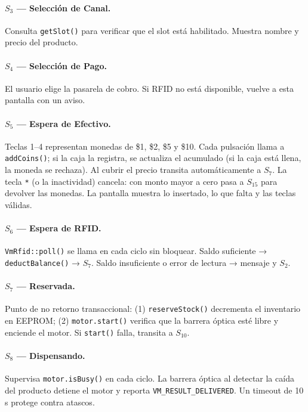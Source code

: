 \documentclass[12pt,a4paper]{article}
\begin{document}
\paragraph{$S_3$ — Selección de Canal.} Consulta \texttt{getSlot()} para
verificar que el slot está habilitado. Muestra nombre y precio del producto.

\paragraph{$S_4$ — Selección de Pago.} El usuario elige la pasarela de cobro.
Si RFID no está disponible, vuelve a esta pantalla con un aviso.

\paragraph{$S_5$ — Espera de Efectivo.} Teclas 1–4 representan monedas de
\$1, \$2, \$5 y \$10. Cada pulsación llama a \texttt{addCoins()}; si la caja
la registra, se actualiza el acumulado (si la caja está llena, la moneda se
rechaza). Al cubrir el precio transita automáticamente a $S_7$. La tecla
\texttt{*} (o la inactividad) cancela: con monto mayor a cero pasa a $S_{15}$
para devolver las monedas. La pantalla muestra lo insertado, lo que falta y
las teclas válidas.

\paragraph{$S_6$ — Espera de RFID.} \texttt{VmRfid::poll()} se llama en cada
ciclo sin bloquear. Saldo suficiente → \texttt{deductBalance()} → $S_7$.
Saldo insuficiente o error de lectura → mensaje y $S_2$.

\paragraph{$S_7$ — Reservada.} Punto de no retorno transaccional:
(1) \texttt{reserveStock()} decrementa el inventario en EEPROM;
(2) \texttt{motor.start()} verifica que la barrera óptica esté libre y enciende el motor.
Si \texttt{start()} falla, transita a $S_{10}$.

\paragraph{$S_8$ — Dispensando.} Supervisa \texttt{motor.isBusy()} en cada
ciclo. La barrera óptica al detectar la caída del producto detiene el motor
y reporta \texttt{VM\_RESULT\_DELIVERED}. Un timeout de 10\,s protege contra atascos.
\end{document}
